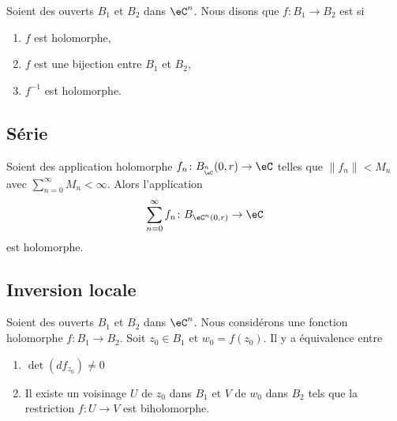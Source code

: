 \begin{definition}
	Soient des ouverts \( B_1\) et \( B_2\) dans \( \eC^n\). Nous disons que \( f\colon B_1\to B_2\) est  si
	\begin{enumerate}
		\item
		      \( f\) est holomorphe,
		\item
		      \( f\) est une bijection entre \( B_1\) et \( B_2\),
		\item
		      \( f^{-1}\) est holomorphe.
	\end{enumerate}
\end{definition}

\subsection{Série}

\begin{proposition}	\label{PROPooJWDGooLLnldZ}
	Soient des application holomorphe \(f_n \colon B_{_\eC^n}(0,r)\to \eC  \) telles que \( \| f_n \|<M_n\) avec \( \sum_{n=0}^{\infty}M_n<\infty\). Alors l'application
	\begin{equation}
		\sum_{n=0}^{\infty}f_n \colon B_{\eC^n(0,r)}\to \eC
	\end{equation}
	est holomorphe.
\end{proposition}


\subsection{Inversion locale}


\begin{theorem}       \label{THOooNBGZooHuGtxW}
	Soient des ouverts \( B_1\) et \( B_2\) dans \( \eC^n\). Nous considérons une fonction holomorphe \( f\colon B_1\to B_2\). Soit \( z_0\in B_1\) et \( w_0=f(z_0)\). Il y a équivalence entre
	\begin{enumerate}
		\item
		      \( \det(df_{z_0})\neq 0\)
		\item
		      Il existe un voisinage \( U\) de \( z_0\) dans \( B_1\) et \( V\) de \( w_0\) dans \( B_2\) tels que la restriction \( f\colon U\to V\) est biholomorphe.
	\end{enumerate}
\end{theorem}


